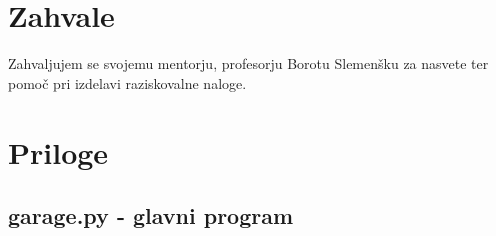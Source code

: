 \documentclass[11pt]{article}
\begin{document}
\begin{flushleft}


\end{flushleft}
\newpage
\section{Zahvale}
Zahvaljujem se svojemu mentorju, profesorju Borotu Slemenšku za nasvete ter pomoč pri izdelavi raziskovalne naloge.
\newpage
\section{Priloge}
\subsection{garage.py - glavni program}
\end{document}
